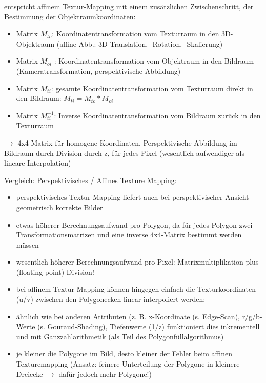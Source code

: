 \documentclass[10pt,landscape]{article}
\begin{document}
\begin{multicols}{3}

entspricht affinem Textur-Mapping mit einem zusätzlichen Zwischenschritt, der Bestimmung der Objektraumkoordinaten:
\begin{itemize}
  \item Matrix $M_{to}$: Koordinatentransformation vom Texturraum in den 3D- Objektraum (affine Abb.: 3D-Translation, -Rotation, -Skalierung)
  \item Matrix $M_{oi}$ : Koordinatentransformation vom Objektraum in den Bildraum (Kameratransformation, perspektivische Abbildung)
  \item Matrix $M_{ti}$: gesamte Koordinatentransformation vom Texturraum direkt in den Bildraum: $M_{ti} = M_{to}*M_{oi}$
  \item Matrix $M_{ti}^{-1}$: Inverse Koordinatentransformation vom Bildraum zurück in den Texturraum
\end{itemize}

$\rightarrow$ 4x4-Matrix für homogene Koordinaten. Perspektivische Abbildung im Bildraum durch Division durch z, für jedes Pixel (wesentlich aufwendiger als lineare Interpolation)

Vergleich: Perspektivisches / Affines Texture Mapping:
\begin{itemize}
  \item perspektivisches Textur-Mapping liefert auch bei perspektivischer Ansicht geometrisch korrekte Bilder
  \item etwas höherer Berechnungsaufwand pro Polygon, da für jedes Polygon zwei Transformationsmatrizen und eine inverse 4x4-Matrix bestimmt werden müssen
  \item wesentlich höherer Berechnungsaufwand pro Pixel: Matrixmultiplikation plus (floating-point) Division!
  \item bei affinem Textur-Mapping können hingegen einfach die Texturkoordinaten (u/v) zwischen den Polygonecken linear interpoliert werden:
  \item ähnlich wie bei anderen Attributen (z. B. x-Koordinate (s. Edge-Scan), r/g/b-Werte (s. Gouraud-Shading), Tiefenwerte (1/z) funktioniert dies inkrementell und mit Ganzzahlarithmetik (als Teil des Polygonfüllalgorithmus)
  \item je kleiner die Polygone im Bild, desto kleiner der Fehler beim affinen Texturemapping (Ansatz: feinere Unterteilung der Polygone in kleinere Dreiecke $\rightarrow$ dafür jedoch mehr Polygone!)
\end{itemize}


\end{multicols}
\end{document}
